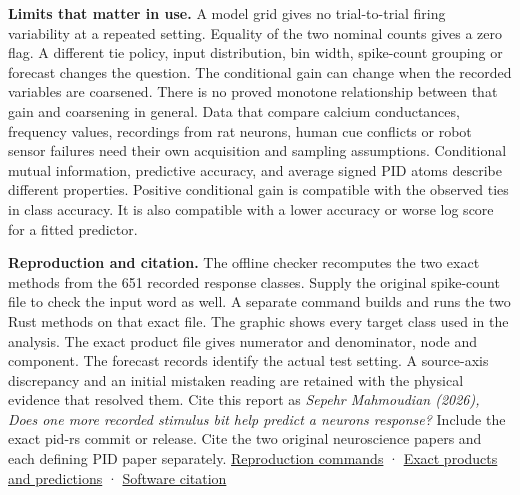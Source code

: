 \textbf{Limits that matter in use.} A model grid gives no trial-to-trial firing variability at a repeated setting. Equality of the two nominal counts gives a zero flag. A different tie policy, input distribution, bin width, spike-count grouping or forecast changes the question. The conditional gain can change when the recorded variables are coarsened. There is no proved monotone relationship between that gain and coarsening in general. Data that compare calcium conductances, frequency values, recordings from rat neurons, human cue conflicts or robot sensor failures need their own acquisition and sampling assumptions. Conditional mutual information, predictive accuracy, and average signed PID atoms describe different properties. Positive conditional gain is compatible with the observed ties in class accuracy. It is also compatible with a lower accuracy or worse log score for a fitted predictor.

\textbf{Reproduction and citation.} The offline checker recomputes the two exact methods from the 651 recorded response classes. Supply the original spike-count file to check the input word as well. A separate command builds and runs the two Rust methods on that exact file. The graphic shows every target class used in the analysis. The exact product file gives numerator and denominator, node and component. The forecast records identify the actual test setting. A source-axis discrepancy and an initial mistaken reading are retained with the physical evidence that resolved them. Cite this report as \emph{Sepehr Mahmoudian (2026), Does one more recorded stimulus bit help predict a neuron\textquotesingle s response?} Include the exact pid-rs commit or release. Cite the two original neuroscience papers and each defining PID paper separately. \href{https://github.com/sepahead/pid-rs/blob/main/audit/research/dendritic-stimulus-resolution/REPRODUCE.md}{Reproduction commands} · \href{https://github.com/sepahead/pid-rs/blob/main/audit/research/dendritic-stimulus-resolution/products-and-predictions.json}{Exact products and predictions} · \href{https://github.com/sepahead/pid-rs/blob/main/CITATION.cff}{Software citation}
